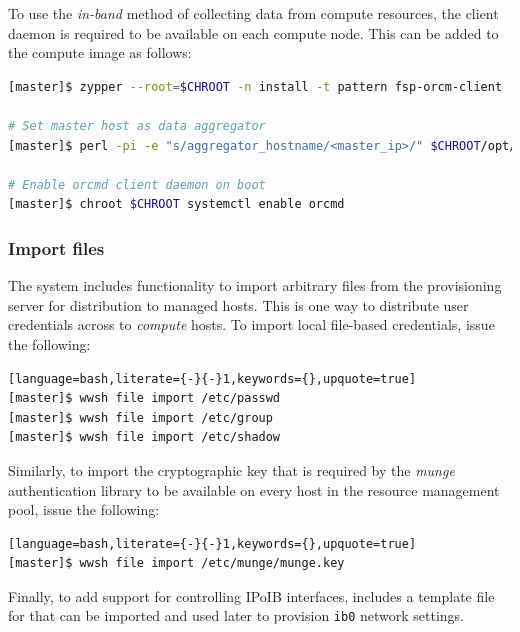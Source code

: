 \documentclass[letterpaper]{article}
\begin{document}
To use the {\em in-band} method of collecting data from compute resources, the
\ORCM{} client daemon is required to be available on each compute node. This can
be added to the compute image as follows:

\begin{lstlisting}[language=bash,keywords={},upquote=true]
[master]$ zypper --root=$CHROOT -n install -t pattern fsp-orcm-client

# Set master host as data aggregator
[master]$ perl -pi -e "s/aggregator_hostname/<master_ip>/" $CHROOT/opt/open-rcm/etc/orcm-site.xml

# Enable orcmd client daemon on boot
[master]$ chroot $CHROOT systemctl enable orcmd
\end{lstlisting}

\subsubsection{Import files} \label{sec:file_import}

The \Warewulf{} system includes functionality to import arbitrary files from the
provisioning server for distribution to managed hosts. This is one way
to distribute user credentials across to {\em compute} hosts. To
import local file-based credentials, issue the following:

\begin{lstlisting}[language=bash,literate={-}{-}1,keywords={},upquote=true]
[master]$ wwsh file import /etc/passwd                                                          
[master]$ wwsh file import /etc/group
[master]$ wwsh file import /etc/shadow 
\end{lstlisting}

\newpage
Similarly, to import the cryptographic key that is required by the {\em munge}
authentication library to be available on every host in the resource management
pool, issue the following:

\begin{lstlisting}[language=bash,literate={-}{-}1,keywords={},upquote=true]
[master]$ wwsh file import /etc/munge/munge.key
\end{lstlisting}

Finally, to add support for controlling IPoIB interfaces, \FSP{} includes a
template file for \Warewulf{} that can be imported and used later to provision
\texttt{ib0} network settings.
\end{document}
